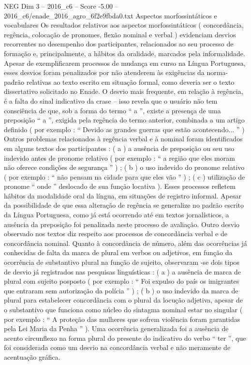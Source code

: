 \begin{textsample}{NEG Dim 3 – 2016\_c6 – Score -5.00 – 2016\_c6/enade\_2016\_agro\_6f2e9fbda0.txt}
Aspectos morfossintáticos e vocabulares Os resultados relativos aos aspectos morfossintáticos ( concordância, regência, colocação de pronomes, flexão nominal e verbal ) evidenciam desvios recorrentes no desempenho dos participantes, relacionados ao seu processo de formação e, principalmente, a hábitos da oralidade, marcados pela informalidade.
Apesar de exemplificarem processos de mudança em curso na Língua Portuguesa, esses desvios foram penalizados por não atenderem às exigências da norma-padrão relativas ao texto escrito em situação formal, como deveria ser o texto dissertativo solicitado no Enade.
O desvio mais frequente, em relação à regência, é a falta do sinal indicativo da crase – isso revela que o usuário não tem consciência de que, sob a forma do termo “ a ”, existe a presença de uma preposição “ a ”, exigida pela regência do termo anterior, combinada a um artigo definido ( por exemplo : “ Devido as grandes guerras que estão acontecendo... ” ) Outros problemas relacionados à regência verbal e à nominal foram identificados em alguns textos dos participantes : ( a ) a ausência de preposição ou seu uso indevido antes de pronome relativo ( por exemplo : “ a região que eles moram não oferece condições de segurança ” ) ; ( b ) o uso indevido do pronome relativo ( por exemplo : “ não pensam na cidade para que eles vão ” ) ; ( c ) utilização de pronome “ onde ” deslocado de sua função locativa ).
Esses processos refletem hábitos da modalidade oral da língua, em situações de registro informal.
Apesar da possibilidade de que essa alteração de regência se generalize no padrão escrito da Língua Portuguesa, como já está ocorrendo até em textos jornalísticos, a ausência da preposição foi penalizada neste processo de avaliação.
Outro desvio observado nos textos diz respeito aos processos de concordância verbal e de concordância nominal.
Quanto à concordância de número, além das ocorrências já conhecidas de falta da marca de plural em verbos ou adjetivos, em função da ocorrência de substantivo plural na função de sujeito, observaram -se dois tipos de desvio já registrados nas pesquisas linguísticas : ( a ) a ausência de marca de plural com sujeito posposto ( por exemplo : “ Foi expulso do país os imigrantes que entraram sem autorização da polícia ” ) ; ( b ) o uso indevido da marca de plural para estabelecer concordância com o plural da locução adjetiva, apesar de o substantivo que funciona como núcleo do sintagma nominal estar no singular ( por exemplo : “ A proteção das mulheres que sofrem violência foram garantidas pela Lei Maria da Penha ” ).
Uma ocorrência generalizada foi a ausência de acento circunflexo na forma plural do presente do indicativo do verbo “ ter ”, que foi considerada como um desvio na concordância verbal e não meramente de acentuação gráfica.

\end{textsample}
